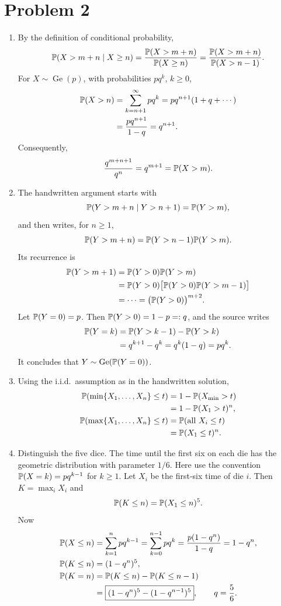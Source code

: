 \documentclass[a4paper]{article}
\begin{document}
\section*{Problem 2}
\begin{enumerate}
\item By the definition of conditional probability,
\[
\P(X>m+n\mid X\geq n)
=\frac{\P(X>m+n)}{\P(X\geq n)}
=\frac{\P(X>m+n)}{\P(X>n-1)}.
\]
For $X\sim\operatorname{Ge}(p)$, with probabilities $pq^k$, $k\geq0$,
\begin{align*}
\P(X>n)&=\sum_{k=n+1}^{\infty}pq^k
=pq^{n+1}(1+q+\cdots)\\
&=\frac{pq^{n+1}}{1-q}=q^{n+1}.
\end{align*}
Consequently,
\[
\frac{q^{m+n+1}}{q^n}=q^{m+1}=\P(X>m).
\]
\item The handwritten argument starts with
\[
\P(Y>m+n\mid Y>n+1)=\P(Y>m),
\]
and then writes, for $n\geq1$,
\[
\P(Y>m+n)=\P(Y>n-1)\P(Y>m).
\]
Its recurrence is
\begin{align*}
\P(Y>m+1)
&=\P(Y>0)\P(Y>m)\\
&=\P(Y>0)\big[\P(Y>0)\P(Y>m-1)\big]\\
&=\cdots=\big(\P(Y>0)\big)^{m+2}.
\end{align*}
Let $\P(Y=0)=p$. Then $\P(Y>0)=1-p=:q$, and the source writes
\begin{align*}
\P(Y=k)&=\P(Y>k-1)-\P(Y>k)\\
&=q^{k+1}-q^k=q^k(1-q)=pq^k.
\end{align*}
It concludes that $Y\sim\operatorname{Ge}(\P(Y=0))$.
\item Using the i.i.d.\ assumption as in the handwritten solution,
\begin{align*}
\P(\min\{X_1,\ldots,X_n\}\leq t)
&=1-\P(X_{\min}>t)\\
&=1-\P(X_1>t)^n,\\
\P(\max\{X_1,\ldots,X_n\}\leq t)
&=\P(\text{all }X_i\leq t)\\
&=\P(X_1\leq t)^n.
\end{align*}
\item Distinguish the five dice. The time until the first six on each die has
the geometric distribution with parameter $1/6$. Here use the convention
$\P(X=k)=pq^{k-1}$ for $k\geq1$.
Let $X_i$ be the first-six time of die $i$. Then $K=\max_iX_i$ and
\[
\P(K\leq n)=\P(X_1\leq n)^5.
\]
Now
\begin{align*}
\P(X\leq n)&=\sum_{k=1}^{n}pq^{k-1}
=\sum_{k=0}^{n-1}pq^k
=\frac{p(1-q^n)}{1-q}=1-q^n,\\
\P(K\leq n)&=(1-q^n)^5,\\
\P(K=n)&=\P(K\leq n)-\P(K\leq n-1)\\
&=\boxed{(1-q^n)^5-(1-q^{n-1})^5},
\qquad q=\frac56.
\end{align*}
\end{enumerate}
\end{document}
